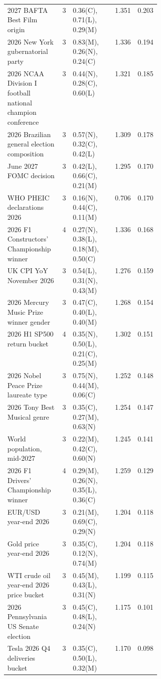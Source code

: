 \begin{longtable}{p{0.36\linewidth} c l r r}
2027 BAFTA Best Film origin & 3 & \scriptsize 0.36(C), 0.71(L), 0.29(M) & 1.351 & 0.203 \\
2026 New York gubernatorial party & 3 & \scriptsize 0.83(M), 0.26(N), 0.24(C) & 1.336 & 0.194 \\
2026 NCAA Division I football national champion conference & 3 & \scriptsize 0.44(N), 0.28(C), 0.60(L) & 1.321 & 0.185 \\
2026 Brazilian general election composition & 3 & \scriptsize 0.57(N), 0.32(C), 0.42(L) & 1.309 & 0.178 \\
June 2027 FOMC decision & 3 & \scriptsize 0.42(L), 0.66(C), 0.21(M) & 1.295 & 0.170 \\
WHO PHEIC declarations 2026 & 3 & \scriptsize 0.16(N), 0.44(C), 0.11(M) & 0.706 & 0.170 \\
2026 F1 Constructors' Championship winner & 4 & \scriptsize 0.27(N), 0.38(L), 0.18(M), 0.50(C) & 1.336 & 0.168 \\
UK CPI YoY November 2026 & 3 & \scriptsize 0.54(L), 0.31(N), 0.43(M) & 1.276 & 0.159 \\
2026 Mercury Music Prize winner gender & 3 & \scriptsize 0.47(C), 0.40(L), 0.40(M) & 1.268 & 0.154 \\
2026 H1 SP500 return bucket & 4 & \scriptsize 0.35(N), 0.50(L), 0.21(C), 0.25(M) & 1.302 & 0.151 \\
2026 Nobel Peace Prize laureate type & 3 & \scriptsize 0.75(N), 0.44(M), 0.06(C) & 1.252 & 0.148 \\
2026 Tony Best Musical genre & 3 & \scriptsize 0.35(C), 0.27(M), 0.63(N) & 1.254 & 0.147 \\
World population, mid-2027 & 3 & \scriptsize 0.22(M), 0.42(C), 0.60(N) & 1.245 & 0.141 \\
2026 F1 Drivers' Championship winner & 4 & \scriptsize 0.29(M), 0.26(N), 0.35(L), 0.36(C) & 1.259 & 0.129 \\
EUR/USD year-end 2026 & 3 & \scriptsize 0.21(M), 0.69(C), 0.29(N) & 1.204 & 0.118 \\
Gold price year-end 2026 & 3 & \scriptsize 0.35(C), 0.12(N), 0.74(M) & 1.204 & 0.118 \\
WTI crude oil year-end 2026 price bucket & 3 & \scriptsize 0.45(M), 0.43(L), 0.31(N) & 1.199 & 0.115 \\
2026 Pennsylvania US Senate election & 3 & \scriptsize 0.45(C), 0.48(L), 0.24(N) & 1.175 & 0.101 \\
Tesla 2026 Q4 deliveries bucket & 3 & \scriptsize 0.35(C), 0.50(L), 0.32(M) & 1.170 & 0.098 \\

\end{longtable}
